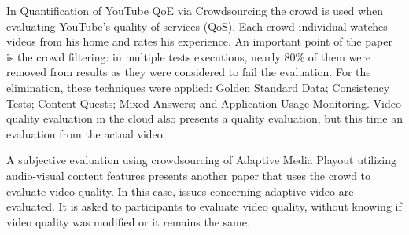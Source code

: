 In Quantification of YouTube QoE via Crowdsourcing \cite{hossfeld2011quantification} the crowd is used when evaluating YouTube's quality of services (QoS). Each crowd individual watches videos from his home and rates his experience. An important point of the paper is the crowd filtering: in multiple tests executions, nearly 80\% of them were removed from results as they were considered to fail the evaluation. For the elimination, these techniques were applied: Golden Standard Data; Consistency Tests; Content Quests; Mixed Answers; and Application Usage Monitoring.
Video quality evaluation in the cloud \cite{keimel2012video} also presents a quality evaluation, but this time an evaluation from the actual video.

A subjective evaluation using crowdsourcing of Adaptive Media Playout utilizing audio-visual content features \cite{rainer2014subjective} presents another paper that uses the crowd to evaluate video quality. In this case, issues concerning adaptive video are evaluated. It is asked to participants to evaluate video quality, without knowing if video quality was modified or it remains the same.
